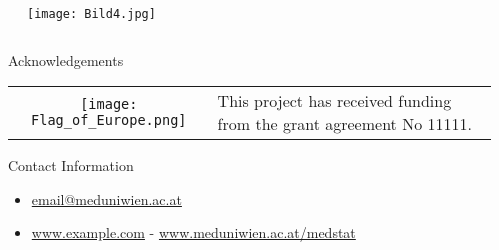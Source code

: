 \documentclass[final]{beamer}
\newlength{\sepmargin}
\newlength{\onecolwid}
\begin{document}
\begin{frame}[t]
\begin{columns}[t]
\begin{column}{\onecolwid}
\begin{block}{ }
                \begin{figure}
                    \texttt{[image: Bild4.jpg]}
				\end{figure}
                
		\end{block}
      \end{column}
      
      \begin{column}{\sepmargin} \end{column}
      \end{columns} 
       
      \begin{columns}[t] %
      
      \begin{column}{\sepmargin} \end{column}
        \begin{column}{\onecolwid} %
			\begin{block}{\large Acknowledgements}
                    \begin{center}
						\begin{tabular}{SL}
							\texttt{[image: Flag\_of\_Europe.png]}  &
							\footnotesize This project has received funding from the  grant agreement No 11111.
						\end{tabular}
					\end{center}
				\end{block}	
                \vspace*{-0.9cm}
				\begin{alertblock}{\large Contact Information}
                \vspace*{-0.5cm}
					\begin{footnotesize}
					\begin{itemize}
						\item \href{mailto:email@meduniwien.ac.at}{email@meduniwien.ac.at}
						\item \href{http://www.example.com/}{www.example.com} - \href{www.meduniwien.ac.at/medstat}{www.meduniwien.ac.at/medstat}
					\end{itemize}
					\end{footnotesize}	
					

\end{alertblock}
\end{column}
\end{columns}
\end{frame}
\end{document}
